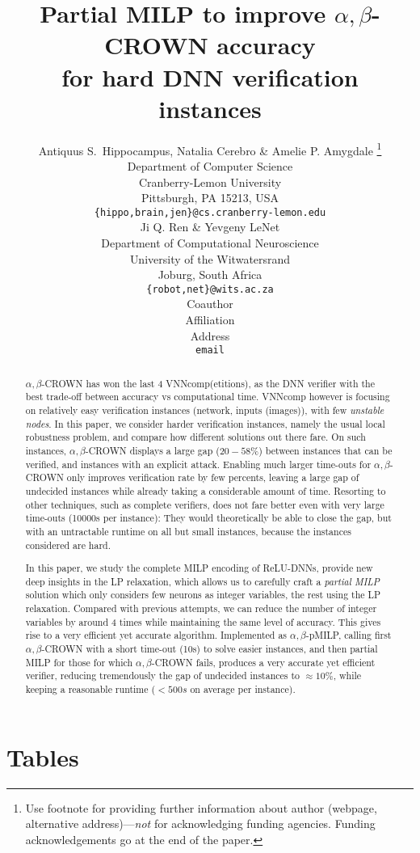 \documentclass{article} %
\title{Partial MILP to improve $\alpha,\beta$-CROWN accuracy \\ for hard DNN verification instances}
\author{Antiquus S.~Hippocampus, Natalia Cerebro \& Amelie P. Amygdale \thanks{ Use footnote for providing further information
about author (webpage, alternative address)---\emph{not} for acknowledging
funding agencies.  Funding acknowledgements go at the end of the paper.} \\
Department of Computer Science\\
Cranberry-Lemon University\\
Pittsburgh, PA 15213, USA \\
\texttt{\{hippo,brain,jen\}@cs.cranberry-lemon.edu} \\
\And
Ji Q. Ren \& Yevgeny LeNet \\
Department of Computational Neuroscience \\
University of the Witwatersrand \\
Joburg, South Africa \\
\texttt{\{robot,net\}@wits.ac.za} \\
\AND
Coauthor \\
Affiliation \\
Address \\
\texttt{email}
}
\theoremstyle{definition}
\begin{document}
\maketitle

\begin{abstract}
$\alpha,\beta$-CROWN has won the last 4 VNNcomp(etitions), as the DNN verifier with the best 
trade-off between accuracy vs computational time. VNNcomp however is focusing on relatively easy verification instances (network, inputs (images)), 
with few {\em unstable nodes}. In this paper, we consider harder verification instances, namely the usual local robustness problem, and 
compare how different solutions out there fare. On such instances, $\alpha,\beta$-CROWN displays a large gap ($20-58\%$) between instances that can be verified, and instances with an explicit attack. Enabling much larger time-outs for $\alpha,\beta$-CROWN only improves verification rate by few percents, leaving a large gap of undecided instances while already taking a considerable amount of time. Resorting to other techniques, such as complete verifiers, does not fare better even with very large time-outs (10000s per instance): They would theoretically be able to close the gap, but with an untractable runtime on all but small instances, because the instances considered are hard. 

In this paper, we study the complete MILP encoding of ReLU-DNNs, provide new deep insights in the LP relaxation, which allows us to carefully craft a {\em partial MILP} solution which only considers few neurons as integer variables, the rest using the LP relaxation. Compared with previous attempts, we can reduce the number of integer variables by around 4 times while maintaining the same level of accuracy. This gives rise to a very efficient yet accurate algorithm. Implemented as $\alpha,\beta$-pMILP, calling first $\alpha,\beta$-CROWN with a short time-out (10s) to solve easier instances, and then partial MILP for those for which $\alpha,\beta$-CROWN fails, produces a very accurate yet efficient verifier, reducing tremendously the gap of undecided instances to $\approx 10\%$, while keeping a reasonable runtime ($<500s$ on average per instance).
\end{abstract}






\section*{Tables}
\end{document}
